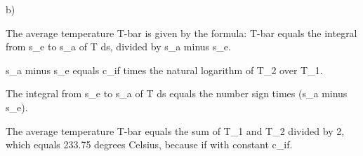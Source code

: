 b)

The average temperature T-bar is given by the formula:
T-bar equals the integral from s_e to s_a of T ds, divided by s_a minus s_e.

s_a minus s_e equals c_if times the natural logarithm of T_2 over T_1.

The integral from s_e to s_a of T ds equals the number sign times (s_a minus s_e).

The average temperature T-bar equals the sum of T_1 and T_2 divided by 2, which equals 233.75 degrees Celsius, because if with constant c_if.